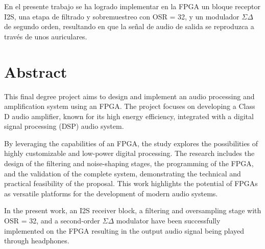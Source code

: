 \par En el presente trabajo se ha logrado implementar en la FPGA un bloque receptor I2S, una etapa de filtrado y sobremuestreo con OSR = 32, y un modulador $\Sigma \Delta$ de segundo orden, resultando en que la señal de audio de salida se reproduzca a través de unos auriculares.



\chapter*{Abstract}
\par This final degree project aims to design and implement an audio processing and amplification system using an FPGA. The project focuses on developing a Class D audio amplifier, known for its high energy efficiency, integrated with a digital signal processing (DSP) audio system.  

\par By leveraging the capabilities of an FPGA, the study explores the possibilities of highly customizable and low-power digital processing. The research includes the design of the filtering and noise-shaping stages, the programming of the FPGA, and the validation of the complete system, demonstrating the technical and practical feasibility of the proposal. This work highlights the potential of FPGAs as versatile platforms for the development of modern audio systems.

\par In the present work, an I2S receiver block, a filtering and oversampling stage with OSR = 32, and a second-order $\Sigma \Delta$ modulator have been successfully implemented on the FPGA resulting in the output audio signal being played through headphones.

